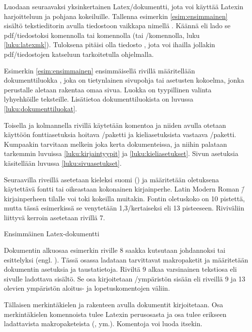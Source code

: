 Luodaan seuraavaksi yksinkertainen Latex\-/dokumentti, jota voi käyttää
Latexin harjoitteluun ja pohjana kokeiluille. Tallenna esimerkin
\ref{esim:ensimmainen} sisältö tekstieditorin avulla tiedostoon vaikkapa
nimellä . Käännä eli lado se pdf\-/tiedostoksi
komennolla  tai komennolla  (tai \-/komennolla, luku
\ref{luku:latexmk}). Tuloksena pitäisi olla tiedosto ,
jota voi ihailla jollakin pdf\-/tiedostojen katseluun tarkoitetulla
ohjelmalla.

Esimerkin \ref{esim:ensimmainen} ensimmäisellä rivillä määritellään
dokumenttiluokka , joka on tietynlainen sivupohja tai
asetusten kokoelma, jonka perustalle aletaan rakentaa omaa sivua. Luokka
 on tyypillinen valinta lyhyehköille teksteille.
Lisätietoa dokumenttiluokista on luvussa \ref{luku:dokumenttiluokat}.

Toisella ja kolmannella rivillä käytetään komentoa  ja niiden avulla otetaan käyttöön fontti\-asetuksia
hoitava \-/paketti ja kieli\-asetuksista vastaava
\-/paketti. Kumpaakin tarvitaan melkein joka kerta
dokumenteissa, ja niihin palataan tarkemmin luvuissa
\ref{luku:kirjaintyypit} ja \ref{luku:kieliasetukset}. Sivun asetuksia
käsitellään luvussa \ref{luku:sivuasetukset}.

Seuraavilla riveillä asetetaan kieleksi suomi () ja
määritetään oletuksena käytettävä fontti tai oikeastaan kokonainen
kirjainperhe. Latin Modern Roman \=/kirjainperheen tilalle voi toki
kokeilla muitakin. Fontin oletuskoko on 10 pistettä, mutta tässä
esimerkissä se venytetään 1,3\-/kertaiseksi eli 13 pisteeseen.
Riviväliin liittyvä kerroin asetetaan rivillä 7.

\begin{esimerkki*}
\caption{Ensimmäinen Latex-dokumentti}
\label{esim:ensimmainen}
\end{esimerkki*}

Dokumentin alku\-osaa esimerkin riville 8 saakka kutsutaan johdannoksi
tai esittelyksi (engl. ). Tässä osassa ladataan
tarvittavat makropaketit ja määritetään dokumentin asetuksia ja
taustatietoja. Riviltä 9 alkaa varsinainen tekstiosa eli sivulle
ladottava sisältö. Se osa kirjoitetaan \-/ympäristön
sisään eli riveillä 9 ja 13 olevien ympäristön aloi\-tus- ja
lopetuskomentojen väliin.

Tällaisen merkintäkielen ja rakenteen avulla dokumentit kirjoitetaan.
Osa merkintäkielen komennoista tulee Latexin perusosasta ja osa tulee
erikseen ladattavista makropaketeista (,
 ym.). Komentoja voi luoda itsekin.
